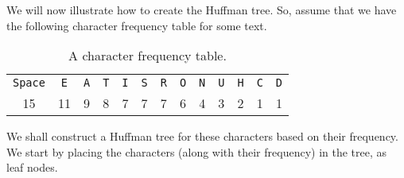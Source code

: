 \documentclass[a4paper, openany]{memoir}
\begin{document}
We will now illustrate how to create the Huffman tree. So, assume that we have the following character frequency table for some text.
\begin{table}[H]
    \centering
    \begin{tabular}{|ccccccccccccc|}
        \hline
        \texttt{Space} & \texttt{E} & \texttt{A} & \texttt{T} & \texttt{I} & \texttt{S} & \texttt{R} & \texttt{O} & \texttt{N} & \texttt{U} & \texttt{H} & \texttt{C} & \texttt{D} \\
        15 & 11 & 9 & 8 & 7 & 7 & 7 & 6 & 4 & 3 & 2 & 1 & 1 \\
        \hline
    \end{tabular}
    \caption{A character frequency table.}
\end{table}
\noindent We shall construct a Huffman tree for these characters based on their frequency. We start by placing the characters (along with their frequency) in the tree, as leaf nodes.
\end{document}

